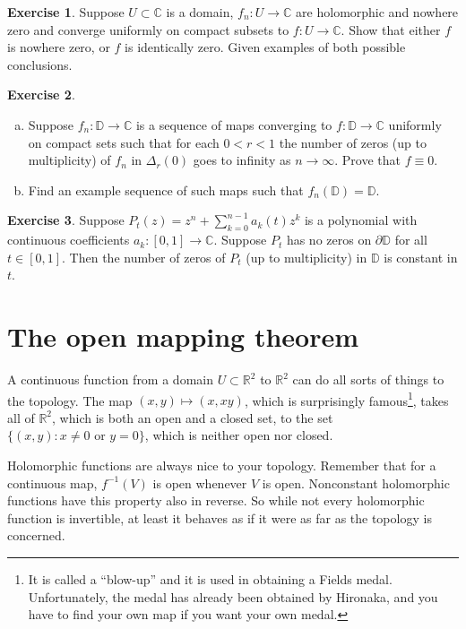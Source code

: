\documentclass[12pt,openany]{book}
\newcommand{\C}{{\mathbb{C}}}
\newcommand{\R}{{\mathbb{R}}}
\newcommand{\D}{{\mathbb{D}}}
\theoremstyle{plain}
\theoremstyle{remark}
\theoremstyle{definition}
\newenvironment{exbox}{%
    \def\FrameCommand{\vrule width 1pt \relax\hspace {10pt}}%
    \MakeFramed {\advance \hsize -\width \FrameRestore }%
}{%
    \endMakeFramed
}
\newenvironment{exparts}{%
    \leavevmode\begin{enumerate}[a),noitemsep,topsep=0pt,parsep=0pt,partopsep=0pt]
}{%
    \end{enumerate}
}
\theoremstyle{exercise}
\newtheorem{exercise}{Exercise}[section]
\theoremstyle{example}
\begin{document}
\begin{exbox}
\begin{exercise}
Suppose $U \subset \C$ is a domain,
$f_n \colon U \to \C$ are holomorphic and nowhere zero
and converge uniformly on compact subsets to $f \colon U \to \C$.
Show that either $f$ is nowhere zero, or $f$ is identically zero.
Given examples of both possible conclusions.
\end{exercise}

\begin{exercise}
\begin{exparts}
\item
Suppose $f_n \colon \D \to \C$ is a sequence of maps converging
to $f \colon \D \to \C$ uniformly on compact sets such that
for each $0 < r < 1$ the number of zeros (up to multiplicity)
of $f_n$ in $\Delta_r(0)$ goes to infinity as $n \to \infty$.
Prove that $f \equiv 0$.
\item
Find an example sequence of such maps such that $f_n(\D) = \D$.
\end{exparts}
\end{exercise}

\begin{exercise}
Suppose $P_t(z) = z^n + \sum_{k=0}^{n-1} a_k(t) z^k$ is a polynomial
with continuous coefficients $a_k \colon [0,1] \to \C$.  Suppose $P_t$ has
no zeros on $\partial \D$ for all $t \in [0,1]$.  Then the number of zeros
of $P_t$ (up to multiplicity) in $\D$ is constant in $t$.
\end{exercise}
\end{exbox}


\section{The open mapping theorem}

A continuous function from a domain $U \subset \R^2$ to $\R^2$ can do all
sorts of things to the topology.  The map $(x,y) \mapsto (x,xy)$, which
is surprisingly famous\footnote{%
It is called a ``blow-up'' and it is used in obtaining a Fields medal.
Unfortunately, the medal has already been obtained by Hironaka, and you
have to find your own map if you want your own medal.},
takes all of $\R^2$, which is both an open and a closed set, to the
set $\{ (x,y) : x \not= 0 \text{ or } y=0 \}$, which is neither open nor
closed.

Holomorphic functions are always nice to your topology.
Remember that for a continuous map, $f^{-1}(V)$ is open whenever
$V$ is open.  Nonconstant holomorphic functions have this property also in
reverse.  So while not every holomorphic function is invertible, at least it
behaves as if it were as far as the topology is concerned.
\end{document}
